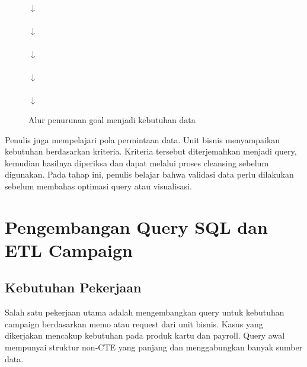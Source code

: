 \begin{figure}[htbp]
\centering
\small
\setlength{\fboxsep}{6pt}
\\[0.12cm] $\downarrow$ \\[0.12cm]
\\[0.12cm] $\downarrow$ \\[0.12cm]
\\[0.12cm] $\downarrow$ \\[0.12cm]
\\[0.12cm] $\downarrow$ \\[0.12cm]
\\[0.12cm] $\downarrow$ \\[0.12cm]
\caption{Alur penurunan goal menjadi kebutuhan data}
\label{fig:goal-data}
\end{figure}

Penulis juga mempelajari pola permintaan data. Unit bisnis menyampaikan kebutuhan berdasarkan kriteria. Kriteria tersebut diterjemahkan menjadi query, kemudian hasilnya diperiksa dan dapat melalui proses cleansing sebelum digunakan. Pada tahap ini, penulis belajar bahwa validasi data perlu dilakukan sebelum membahas optimasi query atau visualisasi.

\section{Pengembangan Query SQL dan ETL Campaign}

\subsection{Kebutuhan Pekerjaan}
Salah satu pekerjaan utama adalah mengembangkan query untuk kebutuhan campaign berdasarkan memo atau request dari unit bisnis. Kasus yang dikerjakan mencakup kebutuhan pada produk kartu dan payroll. Query awal mempunyai struktur non-CTE yang panjang dan menggabungkan banyak sumber data.

